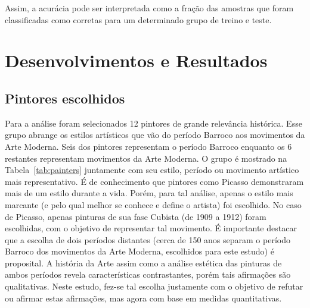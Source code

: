 Assim, a acurácia pode ser interpretada como a fração das amostras que
foram classificadas como corretas para um determinado grupo de treino
e teste.


\chapter{Desenvolvimentos e Resultados}
\label{chap:resultados}


\section{Pintores escolhidos}

Para a análise foram selecionados 12 pintores de grande relevância
histórica. Esse grupo abrange os estilos artísticos que vão do período
Barroco aos movimentos da Arte Moderna. Seis dos pintores representam
o período Barroco enquanto os 6 restantes representam movimentos da
Arte Moderna. O grupo é mostrado na Tabela~\ref{tab:painters}
juntamente com seu estilo, período ou movimento artístico mais
representativo. É de conhecimento que pintores como Picasso
demonstraram mais de um estilo durante a vida. Porém, para tal
análise, apenas o estilo mais marcante (e pelo qual melhor se conhece
e define o artista) foi escolhido. No caso de Picasso, apenas pinturas
de sua fase Cubista (de 1909 a 1912) foram escolhidas, com o objetivo
de representar tal movimento. É importante destacar que a escolha de
dois períodos distantes (cerca de 150 anos separam o período Barroco
dos movimentos da Arte Moderna, escolhidos para este estudo) é
proposital. A história da Arte assim como a análise estética das
pinturas de ambos períodos revela características contrastantes, porém
tais afirmações são qualitativas. Neste estudo, fez-se tal escolha
justamente com o objetivo de refutar ou afirmar estas afirmações, mas
agora com base em medidas quantitativas.

